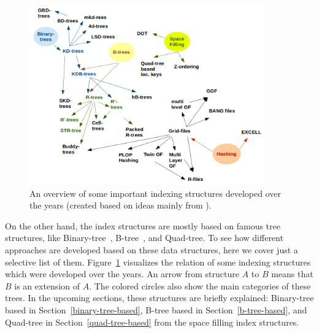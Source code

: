 \documentclass[a4paper,12pt]{article}
\begin{document}
\begin{figure}
\centering
\includegraphics[width=0.9\textwidth]{Trees}
\caption{An overview of some important indexing structures developed over the years 
(created based on ideas mainly from \cite{survey}).}
\label{trees}
\end{figure}

On the other hand, the index structures are mostly based on famous tree structures, like Binary-tree~\cite{binarytree}, B-tree~\cite{btree}, and Quad-tree. 
To see how different approaches are developed based on these data structures, here we cover just a selective list of them. Figure~\ref{trees} visualizes the relation of some indexing structures which were developed over the years. An arrow from structure $A$ to $B$ means that $B$ is an extension of $A$. The colored circles also show the main categories of these
trees. In the upcoming sections, these structures are briefly explained:
Binary-tree based in Section~\ref{binary-tree-based}, 
B-tree based in Section~\ref{b-tree-based}, 
and Quad-tree in Section~\ref{quad-tree-based} from the space filling index structures.
\end{document}
